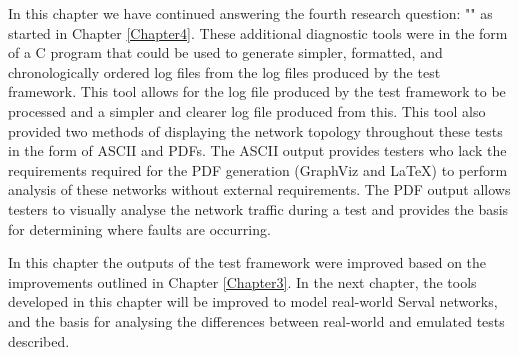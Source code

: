 In this chapter we have continued answering the fourth research question: "\fourthRQ" as started in Chapter \ref{Chapter4}.
These additional diagnostic tools were in the form of a C program that could be used to generate simpler, formatted, and chronologically ordered log files from the log files produced by the test framework.
This tool allows for the log file produced by the test framework to be processed and a simpler and clearer log file produced from this.
This tool also provided two methods of displaying the network topology throughout these tests in the form of ASCII and PDFs.
The ASCII output provides testers who lack the requirements required for the PDF generation (GraphViz and LaTeX) to perform analysis of these networks without external requirements.
The PDF output allows testers to visually analyse the network traffic during a test and provides the basis for determining where faults are occurring.

In this chapter the outputs of the test framework were improved based on the improvements outlined in Chapter \ref{Chapter3}.
In the next chapter, the tools developed in this chapter will be improved to model real-world Serval networks, and the basis for analysing the differences between real-world and emulated tests described.
